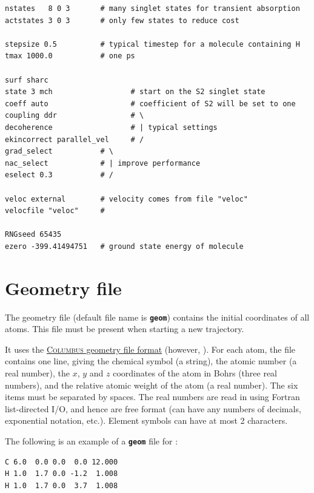 \documentclass[a4paper,11pt,DIV=15,openany,twoside=false]{scrbook}
\newcommand{\todo}[1]{\textcolor{RL}{#1}}
\newcommand{\ttt}[1]{\textbf{\texttt{#1}}}
\newenvironment{example}{
  \vspace{0mm}
  \definecolor{shadecolor}{HTML}{E4F4FF}
  \begin{shaded}
}{
  \end{shaded}
}
\begin{document}
\begin{example}
  \begin{verbatim}
nstates   8 0 3       # many singlet states for transient absorption
actstates 3 0 3       # only few states to reduce cost

stepsize 0.5          # typical timestep for a molecule containing H
tmax 1000.0           # one ps

surf sharc
state 3 mch                  # start on the S2 singlet state
coeff auto                   # coefficient of S2 will be set to one
coupling ddr                 # \
decoherence                  # | typical settings
ekincorrect parallel_vel     # /
grad_select           # \
nac_select            # | improve performance
eselect 0.3           # /

veloc external        # velocity comes from file "veloc"
velocfile "veloc"     #

RNGseed 65435
ezero -399.41494751   # ground state energy of molecule
  \end{verbatim}
\end{example}



\section{Geometry file}\label{sec:geomfile}

The geometry file (default file name is \ttt{geom}) contains the initial coordinates of all atoms. This file must be present when starting a new trajectory.

It uses the \href{http://www.univie.ac.at/columbus/docs_COL70/documentation_main.html}{\textsc{Columbus} geometry file format} (however, \todo{}). For each atom, the file contains one line, giving the chemical symbol (a string), the atomic number (a real number), the $x$, $y$ and $z$ coordinates of the atom in Bohrs (three real numbers), and the relative atomic weight of the atom (a real number). The six items must be separated by spaces. The real numbers are read in using Fortran list-directed I/O, and hence are free format (can have any numbers of decimals, exponential notation, etc.). Element symbols can have at most 2 characters.

The following is an example of a \ttt{geom} file for \ce{CH2}:
\begin{example}
  \begin{verbatim}
C 6.0  0.0 0.0  0.0 12.000
H 1.0  1.7 0.0 -1.2  1.008
H 1.0  1.7 0.0  3.7  1.008
  \end{verbatim}
\end{example}
\end{document}
